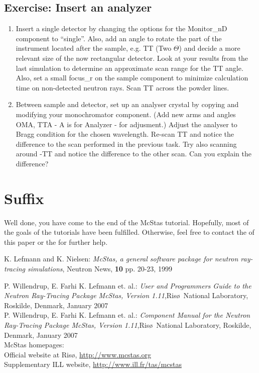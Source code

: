 \subsection{Exercise: Insert an analyzer}
\begin{enumerate}
\item{Insert a single detector by changing the options for the
    Monitor\_nD component to ``single''. Also, add an angle to rotate
    the part of the instrument located after the sample, e.g. TT (Two
    $\Theta$) and decide a more relevant size of the now rectangular detector. Look at your results from the last simulation to
    determine an approximate scan range for the TT angle. Also,
    set a small focus\_r on the sample component to minimize
    calculation time on non-detected neutron rays. Scan TT across the
    powder lines.}
\item{Between sample and detector, set up an analyser crystal by
    copying and modifying your monochromator component. (Add new arms
    and angles OMA, TTA - A is for Analyzer - for adjusment.) 
    Adjust the analyser to Bragg condition
    for the chosen wavelength. Re-scan TT and notice the difference to
    the scan performed in the previous task. Try also scanning around
    -TT and notice the difference to the other scan. Can you explain
    the difference?}
\end{enumerate}
\section{Suffix}
Well done, you have come to the end of the McStas tutorial. Hopefully,
most of the goals of the tutorials have been fulfilled. Otherwise,
feel free to contact the
of this paper or the  for further help.

\begin{thebibliography}{10}
K. Lefmann and K. Nielsen: \emph{McStas, a general software package
  for neutron ray-tracing simulations}, Neutron News, {\bf 10} pp. 20-23, 1999

P. Willendrup, E. Farhi K. Lefmann et. al.: \emph{User and Programmers
  Guide to the Neutron Ray-Tracing Package McStas, Version 1.11},Ris\o\
National Laboratory, Roskilde, Denmark, January 2007\\
P. Willendrup, E. Farhi K. Lefmann et. al.: \emph{Component Manual for
 the Neutron Ray-Tracing Package McStas, Version 1.11},Ris\o\
National Laboratory, Roskilde, Denmark, January 2007\\

McStas homepages:\\
\newblock Official website at Ris\o, \url{http://www.mcstas.org}\\
\newblock Supplementary ILL website, \url{http://www.ill.fr/tas/mcstas}\\
\end{thebibliography}


